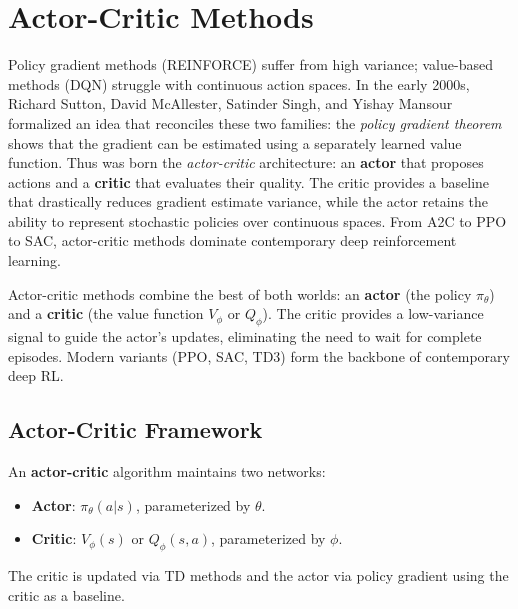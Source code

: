 \chapter{Actor-Critic Methods}
\label{ch:actor_critic}

Policy gradient methods (REINFORCE) suffer from high variance; value-based methods (DQN) struggle with continuous action spaces. In the early 2000s, Richard Sutton, David McAllester, Satinder Singh, and Yishay Mansour formalized an idea that reconciles these two families: the \emph{policy gradient theorem} shows that the gradient can be estimated using a separately learned value function. Thus was born the \emph{actor-critic} architecture: an \textbf{actor} that proposes actions and a \textbf{critic} that evaluates their quality. The critic provides a baseline that drastically reduces gradient estimate variance, while the actor retains the ability to represent stochastic policies over continuous spaces. From A2C to PPO to SAC, actor-critic methods dominate contemporary deep reinforcement learning.

\begin{intuition}
Actor-critic methods combine the best of both worlds: an \textbf{actor}
(the policy $\pi_\theta$) and a \textbf{critic} (the value function
$V_\phi$ or $Q_\phi$). The critic provides a low-variance signal to
guide the actor's updates, eliminating the need to wait for complete
episodes. Modern variants (PPO, SAC, TD3) form the backbone of
contemporary deep RL.
\end{intuition}

\section{Actor-Critic Framework}
\label{sec:ac:framework}

\begin{definition}
An \textbf{actor-critic} algorithm maintains two networks:
\begin{itemize}
    \item \textbf{Actor}: $\pi_\theta(a|s)$, parameterized by $\theta$.
    \item \textbf{Critic}: $V_\phi(s)$ or $Q_\phi(s,a)$, parameterized
    by $\phi$.
\end{itemize}
The critic is updated via TD methods and the actor via policy gradient
using the critic as a baseline.
\end{definition}

